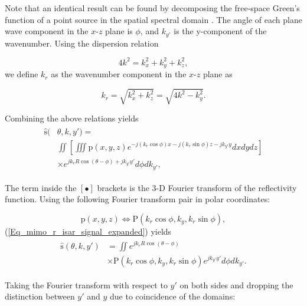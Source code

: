 \documentclass[conference]{IEEEtran}
\begin{document}
		Note that an identical result can be found by decomposing the free-space Green's function of a point source in the spatial spectral domain \cite{Detlefsen:mmWaveImagingOfHumans}. The angle of each plane wave component in the $x\text{-}z$ plane is $\phi$, and $k_{y'}$ is the y-component of the wavenumber. Using the dispersion relation
		
		\begin{equation}
		4k^2 = k_x^2 + k_y^2 + k_z^2,
		\end{equation}
		we define $k_r$ as the wavenumber component in the $x\text{-}z$ plane as
		
		\begin{equation}
		\label{Eq_stolt_1}
		k_r = \sqrt{k_x^2+k_z^2} = \sqrt{4k^2 - k_y^2}.
		\end{equation}
		
		Combining the above relations yields
		\begin{align}
		\begin{split}
		\hat{\text{s}}(&\theta,k,y') = \\
		& \iint \left[ \iiint \text{p}(x,y,z)e^{-j(k_r\cos\phi)x-j(k_r\sin\phi)z-jk_{y'}y}dxdydz \right] \\
		& \times e^{jk_rR\cos(\theta-\phi) + jk_{y'}y'} d\phi dk_{y'},
		\end{split}
		\label{Eq_mimo_r_isar_signal_expanded}
		\end{align}
		
		The term inside the $[\bullet]$ brackets is the 3-D Fourier transform of the reflectivity function. Using the following Fourier transform pair in polar coordinates:
		
		\begin{equation}
		\text{p}(x,y,z) \iff \text{P}(k_r\cos\phi,k_y,k_r\sin\phi),
		\end{equation}
		(\ref{Eq_mimo_r_isar_signal_expanded}) yields
		\begin{align}
		\begin{split}
		\hat{\text{s}}(\theta,k,y') &= \iint e^{jk_rR\cos(\theta-\phi)} \\
		&\times \text{P}(k_r\cos\phi,k_y,k_r\sin\phi) e^{jk_{y'}y'}d\phi dk_{y'}.
		\end{split}
		\label{Eq_mimo_r_isar_signal_expanded_2}
		\end{align}
		
		Taking the Fourier transform with respect to $y'$ on both sides and dropping the distinction between $y'$ and $y$ due to coincidence of the domains:
		
\end{document}

